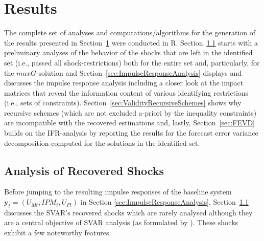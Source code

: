 \documentclass[a4paper,11pt,listof=nochaptergap,oneside,pointednumbers,bibtotoc,bigheadings,liststotoc,hidelinks]{scrbook}
\theoremstyle{mysatz}
\theoremstyle{mydefinition}
\theoremstyle{mytheorem}
\theoremstyle{mybemerkung}
\newcommand{\vect}[1]{\boldsymbol{\mathbf{#1}}}
\begin{document}
\chapter{Results}
\label{Results}

The complete set of analyses and computations/algorithms for the generation of the results presented in Section~\ref{Results} were conducted in R. Section~\ref{sec:uncertaintyShocks} starts with a preliminary analyses of the behavior of the shocks that are left in the identified set (i.e., passed all shock-restrictions) both for the entire set and, particularly, for the $maxG$-solution and Section~\ref{sec:ImpulseResponseAnalysis} displays and discusses the impulse response analysis including a closer look at the impact matrices that reveal the information content of various identifying restrictions (i.e., sets of constraints). Section~\ref{sec:ValidityRecursiveSchemes} shows why recursive schemes (which are not excluded a-priori by the inequality constraints) are incompatible with the recovered estimations and, lastly, Section~\ref{sec:FEVD} builds on the IFR-analysis by reporting the results for the forecast error variance decomposition computed for the solutions in the identified set.


\section{Analysis of Recovered Shocks}
\label{sec:uncertaintyShocks}

Before jumping to the resulting impulse responses of the baseline system $\vect{y}_t = (U_{Mt}, IPM_{t}, U_{Ft})$ in Section \ref{sec:ImpulseResponseAnalysis}, Section~\ref{sec:uncertaintyShocks} discusses the SVAR's recovered shocks which are rarely analysed although they are a central objective of SVAR analysis (as formulated by \citealp{ludvigsonetal:20a}). These shocks exhibit a few noteworthy features.\\
\end{document}
